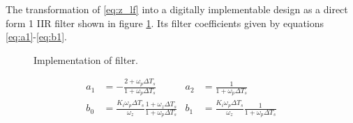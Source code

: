 		The transformation of \ref{eq:z_lf} into a digitally implementable design as a direct form 1 IIR filter shown in figure \ref{fig:filt_imple}. Its filter coefficients given by equations \ref{eq:a1}-\ref{eq:b1}.
		\begin{figure}[htb!]
			\center
			\caption{Implementation of filter.}
			\label{fig:filt_imple}
		\end{figure}
		\begin{align}
			a_1 &= -\frac{2+\omega_p\Delta T_s}{1+\omega_p\Delta T_s}\label{eq:a1} 
			& a_2 &= \frac{1}{1+\omega_p\Delta T_s} \\
			b_0 &= \frac{K_i\omega_p\Delta T_s}{\omega_z}\frac{1+\omega_z\Delta T_s}{1+\omega_p\Delta T_s}
			& b_1 &= \frac{K_i\omega_p\Delta T_s}{\omega_z}\frac{1}{1+\omega_p\Delta T_s}\label{eq:b1}
		\end{align}


